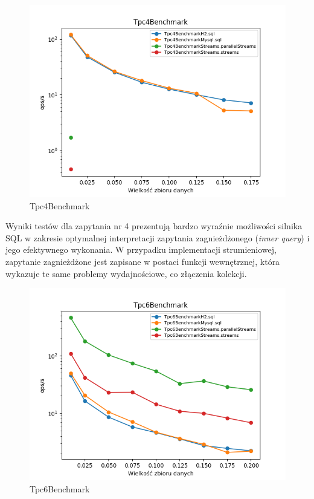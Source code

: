 \documentclass[12pt,twoside,openright]{extarticle}
\begin{document}
\newpage
\begin{figure}[H]
\centering
\includegraphics[width=15cm]{plots/Tpc4Benchmark}
\caption{Tpc4Benchmark}
\end{figure}

    Wyniki testów dla zapytania nr 4 prezentują bardzo wyraźnie możliwości silnika SQL w zakresie optymalnej interpretacji zapytania zagnieżdżonego (\textit{inner query}) i jego efektywnego wykonania. W przypadku implementacji strumieniowej, zapytanie zagnieżdżone jest zapisane w postaci funkcji wewnętrznej, która wykazuje te same problemy wydajnościowe, co złączenia kolekcji. 

\newpage
\begin{figure}[H]
\centering
\includegraphics[width=15cm]{plots/Tpc6Benchmark}
\caption{Tpc6Benchmark}
\end{figure}
\end{document}
